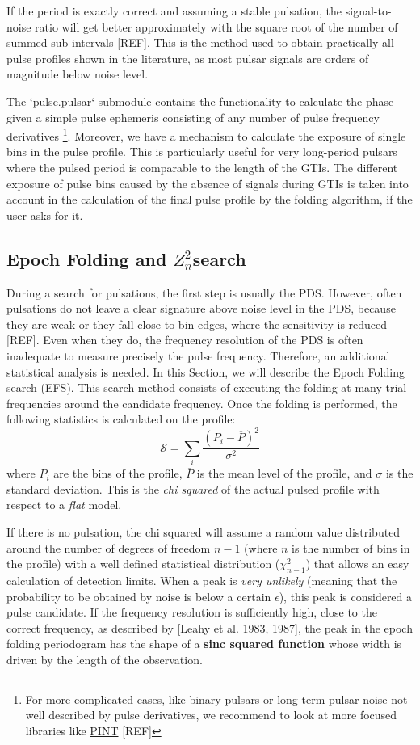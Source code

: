 \documentclass[12pt]{emulateapj}
\newcommand{\zsq}{\ensuremath{Z^2_n}}
\begin{document}
If the period is exactly correct and assuming a stable pulsation, the signal-to-noise ratio will get better approximately with the square root of the number of summed sub-intervals [REF].
This is the method used to obtain practically all pulse profiles shown in the literature, as most pulsar signals are orders of magnitude below noise level.

The `pulse.pulsar` submodule contains the functionality to calculate the phase given a simple pulse ephemeris consisting of any number of pulse frequency derivatives%
\footnote{For more complicated cases, like binary pulsars or long-term pulsar noise not well described by pulse derivatives, we recommend to look at more focused libraries like \href{https://github.com/nanograv/PINT}{PINT} [REF]}.
Moreover, we have a mechanism to calculate the exposure of single bins in the pulse profile. 
This is particularly useful for very long-period pulsars where the pulsed period is comparable to the length of the GTIs.
The different exposure of pulse bins caused by the absence of signals during GTIs is taken into account in the calculation of the final pulse profile by the folding algorithm, if the user asks for it. 

\subsection{Epoch Folding and \zsq search}
\label{sec:efzsq}
During a search for pulsations, the first step is usually the PDS. 
However, often pulsations do not leave a clear signature above noise level in the PDS, because they are weak or they fall close to bin edges, where the sensitivity is reduced [REF].
Even when they do, the frequency resolution of the PDS is often inadequate to measure precisely the pulse frequency.
Therefore, an additional statistical analysis is needed. 
In this Section, we will describe the Epoch Folding search (EFS).
This search method consists of executing the folding at many trial frequencies around the candidate frequency.
Once the folding is performed, the following statistics is calculated on the profile:
\begin{equation}
\mathcal{S} = \sum_i\frac{(P_i - \overline{P})^2}{\sigma^2}
\end{equation}
where $P_i$ are the bins of the profile, $\overline{P}$ is the mean level of the profile, and $\sigma$ is the standard deviation.
This is the \textit{chi squared} of the actual pulsed profile with respect to a \textit{flat} model.

If there is no pulsation, the chi squared will assume a random value distributed around the number of degrees of freedom $n - 1$ (where $n$ is the number of bins in the profile) with a well defined statistical distribution ($\chi^2_{n - 1}$) that allows an easy calculation of detection limits. 
When a peak is \textit{very unlikely} (meaning that the probability to be obtained by noise is below a certain $\epsilon$), this peak is considered a pulse candidate.
If the frequency resolution is sufficiently high, close to the correct frequency, as described by [Leahy et al. 1983, 1987], the peak in the epoch folding periodogram has the shape of a \textbf{sinc squared function} whose width is driven by the length of the observation.
\end{document}
